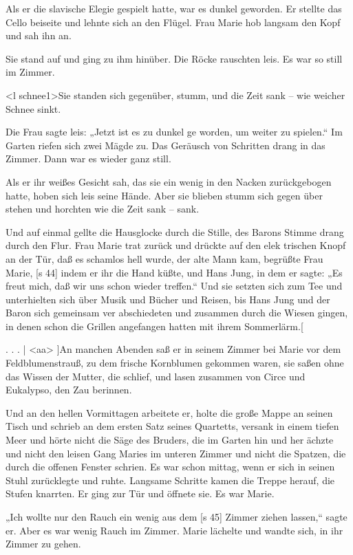Als er die slavische Elegie gespielt hatte, war
es dunkel geworden. Er stellte das Cello beiseite und
lehnte sich an den Flügel. Frau Marie hob langsam
den Kopf und sah ihn an.

Sie stand auf und ging zu ihm hinüber. Die Röcke
rauschten leis. Es war so still im Zimmer.

<l schnee1>Sie standen sich gegenüber, stumm, und die Zeit
sank – wie weicher Schnee sinkt.

Die Frau sagte leis: „Jetzt ist es zu dunkel ge­
worden, um weiter zu spielen.“ Im Garten riefen sich
zwei Mägde zu. Das Geräusch von Schritten drang
in das Zimmer. Dann war es wieder ganz still.

Als er ihr weißes Gesicht sah, das sie ein wenig
in den Nacken zurückgebogen hatte, hoben sich leis
seine Hände. Aber sie blieben stumm sich gegen­
über stehen und horchten wie die Zeit sank – sank.

Und auf einmal gellte die Hausglocke durch die
Stille, des Barons Stimme drang durch den Flur.
Frau Marie trat zurück und drückte auf den elek­
trischen Knopf an der Tür, daß es schamlos hell
wurde, der alte Mann kam, begrüßte Frau Marie,
[s 44]
indem er ihr die Hand küßte, und Hans Jung, in­
dem er sagte: „Es freut mich, daß wir uns schon
wieder treffen.“ Und sie setzten sich zum Tee und
unterhielten sich über Musik und Bücher und Reisen,
bis Hans Jung und der Baron sich gemeinsam ver­
abschiedeten und zusammen durch die Wiesen gingen,
in denen schon die Grillen angefangen hatten mit
ihrem Sommerlärm.[

. . . |
<aa>
]An manchen Abenden saß er in seinem
Zimmer bei Marie vor dem Feldblumenstrauß, zu
dem frische Kornblumen gekommen waren, sie saßen
ohne das Wissen der Mutter, die schlief, und lasen
zusammen von Circe und Eukalypso, den Zau­
berinnen.

Und an den hellen Vormittagen arbeitete er,
holte die große Mappe an seinen Tisch und schrieb
an dem ersten Satz seines Quartetts, versank in
einem tiefen Meer und hörte nicht die Säge des
Bruders, die im Garten hin und her ächzte und
nicht den leisen Gang Maries im unteren Zimmer
und nicht die Spatzen, die durch die offenen Fenster
schrien. Es war schon mittag, wenn er sich in seinen
Stuhl zurücklegte und ruhte. Langsame Schritte kamen
die Treppe herauf, die Stufen knarrten. Er ging zur
Tür und öffnete sie. Es war Marie.

„Ich wollte nur den Rauch ein wenig aus dem
[s 45]
Zimmer ziehen lassen,“ sagte er. Aber es war wenig
Rauch im Zimmer. Marie lächelte und wandte sich,
in ihr Zimmer zu gehen.

